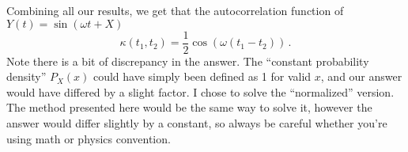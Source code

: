 Combining all our results, we get that the autocorrelation function of $Y(t) = \sin(\omega t + X)$
\begin{equation*}
  \kappa(t_1 , t_2) = \frac{1}{2} \cos(\omega(t_1 - t_2 ) )
  \, .
\end{equation*}
Note there is a bit of discrepancy in the answer.
The ``constant probability density'' $P_{X}(x)$ could have simply been defined as 1 for valid $x$, and our answer would have differed by a slight factor.
I chose to solve the ``normalized'' version.
The method presented here would be the same way to solve it, however the answer would differ slightly by a constant, so always be careful whether you're using math or physics convention.

